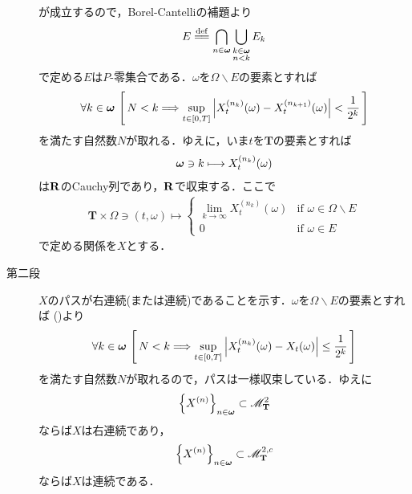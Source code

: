 \begin{sketch}
\begin{description}
				が成立するので，Borel-Cantelliの補題より
				\begin{align}
					E \defeq \bigcap_{n \in \Natural} \bigcup_{\substack{k \in \Natural \\ n < k}} E_k
				\end{align}
				で定める$E$は$P$-零集合である．$\omega$を$\Omega \backslash E$の要素とすれば
				\begin{align}
					\forall k \in {\boldsymbol \omega}\,
					\left[\, N < k \Longrightarrow \operatorname*{sup}_{t \in [0,T]} \left|X_t^{(n_k)}(\omega) - X_t^{(n_{k+1})}(\omega)\right| < \frac{1}{2^k}\, \right]
					\label{fom:thm_pseudo_metric_on_square_integrable_martingales_1}
				\end{align}
				を満たす自然数$N$が取れる．ゆえに，いま$t$を$\mathbf{T}$の要素とすれば
				\begin{align}
					{\boldsymbol \omega} \ni k \longmapsto X_t^{(n_k)}(\omega)
				\end{align}
				は$\mathbf{R}$のCauchy列であり，$\mathbf{R}$で収束する．ここで
				\begin{align}
					\mathbf{T} \times \Omega \ni (t,\omega) \longmapsto
					\begin{cases}
						\lim_{k \to \infty} X_t^{(n_k)}(\omega) & \mbox{if } \omega \in \Omega \backslash E \\
						0 & \mbox{if } \omega \in E
					\end{cases} 
				\end{align}
				で定める関係を$X$とする．
			
			\item[第二段]
				$X$のパスが右連続(または連続)であることを示す．$\omega$を$\Omega \backslash E$の要素とすれば
				()より
				\begin{align}
					\forall k \in {\boldsymbol \omega}\,
					\left[\, N < k \Longrightarrow \operatorname*{sup}_{t \in [0,T]} \left|X_t^{(n_k)}(\omega) - X_t(\omega)\right| \leq \frac{1}{2^k}\, \right]
				\end{align}
				を満たす自然数$N$が取れるので，パスは一様収束している．ゆえに
				\begin{align}
					\left\{X^{(n)}\right\}_{n \in {\boldsymbol \omega}} \subset \mathscr{M}^2_{\mathbf{T}}
				\end{align}
				ならば$X$は右連続であり，
				\begin{align}
					\left\{X^{(n)}\right\}_{n \in {\boldsymbol \omega}} \subset \mathscr{M}^{2,c}_{\mathbf{T}}
				\end{align}
				ならば$X$は連続である．
			

\end{description}
\end{sketch}
